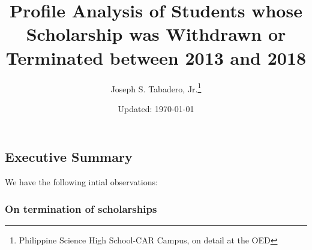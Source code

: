 \documentclass[a4paper]{article}
\title{Profile Analysis of Students whose Scholarship was Withdrawn or
Terminated between 2013 and 2018}
\author{Joseph S. Tabadero,
Jr.\thanks{Philippine Science High School-CAR Campus, on detail at the OED}}
\date{Updated: \today}
\begin{document}
\maketitle

\hypertarget{executive-summary}{%
\subsection{Executive Summary}\label{executive-summary}}

We have the following intial observations:

\hypertarget{on-termination-of-scholarships}{%
\subsubsection{On termination of
scholarships}\label{on-termination-of-scholarships}}
\end{document}
